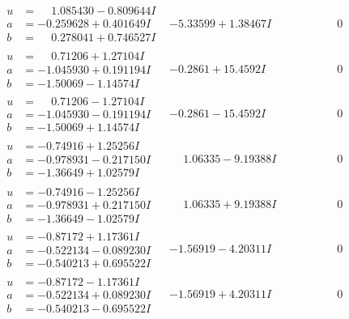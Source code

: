\documentclass[1p]{elsarticle_modified}
\theoremstyle{definition}
\begin{document}
$$\begin{array}{c|c|c}
\begin{aligned}
u &= \phantom{-}1.085430 - 0.809644 I \\
a &= -0.259628 + 0.401649 I \\
b &= \phantom{-}0.278041 + 0.746527 I\end{aligned}
 & -5.33599 + 1.38467 I & \phantom{-0.000000 } 0 \\ \hline\begin{aligned}
u &= \phantom{-}0.71206 + 1.27104 I \\
a &= -1.045930 + 0.191194 I \\
b &= -1.50069 - 1.14574 I\end{aligned}
 & -0.2861 + 15.4592 I & \phantom{-0.000000 } 0 \\ \hline\begin{aligned}
u &= \phantom{-}0.71206 - 1.27104 I \\
a &= -1.045930 - 0.191194 I \\
b &= -1.50069 + 1.14574 I\end{aligned}
 & -0.2861 - 15.4592 I & \phantom{-0.000000 } 0 \\ \hline\begin{aligned}
u &= -0.74916 + 1.25256 I \\
a &= -0.978931 - 0.217150 I \\
b &= -1.36649 + 1.02579 I\end{aligned}
 & \phantom{-}1.06335 - 9.19388 I & \phantom{-0.000000 } 0 \\ \hline\begin{aligned}
u &= -0.74916 - 1.25256 I \\
a &= -0.978931 + 0.217150 I \\
b &= -1.36649 - 1.02579 I\end{aligned}
 & \phantom{-}1.06335 + 9.19388 I & \phantom{-0.000000 } 0 \\ \hline\begin{aligned}
u &= -0.87172 + 1.17361 I \\
a &= -0.522134 - 0.089230 I \\
b &= -0.540213 + 0.695522 I\end{aligned}
 & -1.56919 - 4.20311 I & \phantom{-0.000000 } 0 \\ \hline\begin{aligned}
u &= -0.87172 - 1.17361 I \\
a &= -0.522134 + 0.089230 I \\
b &= -0.540213 - 0.695522 I\end{aligned}
 & -1.56919 + 4.20311 I & \phantom{-0.000000 } 0\\

\end{array}$$
\end{document}
